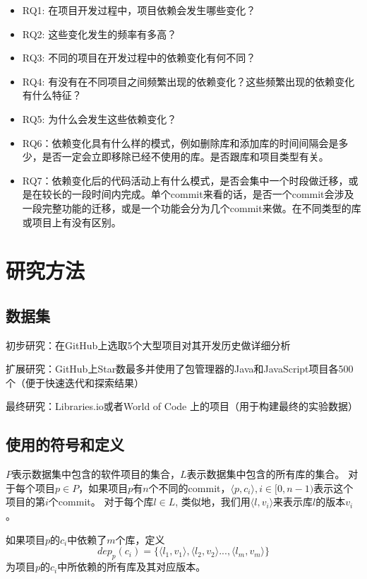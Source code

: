 \documentclass[UTF8]{ctexart}
\begin{document}
\begin{itemize}
    \item RQ1: 在项目开发过程中，项目依赖会发生哪些变化？
    \item RQ2: 这些变化发生的频率有多高？%
	\item RQ3: 不同的项目在开发过程中的依赖变化有何不同？
	\item RQ4: 有没有在不同项目之间频繁出现的依赖变化？这些频繁出现的依赖变化有什么特征？
    \item RQ5: 为什么会发生这些依赖变化？
	\item RQ6：依赖变化具有什么样的模式，例如删除库和添加库的时间间隔会是多少，是否一定会立即移除已经不使用的库。是否跟库和项目类型有关。
	\item RQ7：依赖变化后的代码活动上有什么模式，是否会集中一个时段做迁移，或是在较长的一段时间内完成。单个commit来看的话，是否一个commit会涉及一段完整功能的迁移，或是一个功能会分为几个commit来做。在不同类型的库或项目上有没有区别。
\end{itemize}

\section{研究方法}

\subsection{数据集}

初步研究：在GitHub上选取5个大型项目对其开发历史做详细分析

扩展研究：GitHub上Star数最多并使用了包管理器的Java和JavaScript项目各500个（便于快速迭代和探索结果）

最终研究：Libraries.io或者World of Code \cite{2019MSR-Ma-WorldOfCode}上的项目（用于构建最终的实验数据）

\subsection{使用的符号和定义}

$P$表示数据集中包含的软件项目的集合，$L$表示数据集中包含的所有库的集合。
对于每个项目$p \in P$，如果项目$p$有$n$个不同的commit，$\langle p, c_i \rangle, i \in [0, n - 1)$表示这个项目的第$i$个commit。
对于每个库$l \in L$, 类似地，我们用$\langle l, v_i \rangle$来表示库$l$的版本$v_i$。

如果项目$p$的$c_i$中依赖了$m$个库，定义
\begin{equation}
dep_p(c_i)=\{\langle l_1, v_1 \rangle,  \langle l_2, v_2 \rangle..., \langle l_m, v_m \rangle \}
\end{equation}
为项目$p$的$c_i$中所依赖的所有库及其对应版本。
\end{document}

